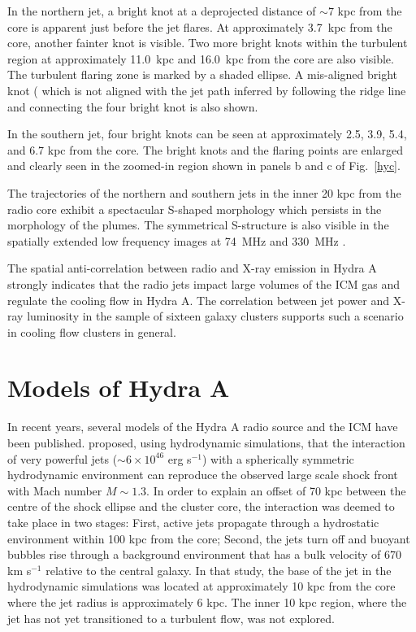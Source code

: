 In the northern jet, a bright knot at a deprojected distance of $\sim 7$ kpc from the core is apparent just before the jet flares. At approximately 3.7~kpc from the core, another fainter knot is visible. Two more bright knots within the turbulent region at approximately 11.0~kpc and 16.0~kpc from the core are also visible. The turbulent flaring zone is marked by a shaded ellipse. A mis-aligned bright knot  ( which is not aligned with the jet path inferred by following the ridge line and connecting the four bright knot is also shown.

 In the southern jet, four bright knots can be seen at approximately 2.5, 3.9, 5.4, and 6.7 kpc from the core. The bright knots and the flaring points are enlarged and clearly seen in the zoomed-in region shown in panels b and c of Fig.~\ref{hyc}. 

The trajectories of the northern and southern jets in the inner 20 kpc from the radio core exhibit a spectacular S-shaped morphology which persists in the morphology of the plumes. The symmetrical S-structure is also visible in the spatially extended low frequency images at 74~MHz and 330~MHz \citep{lane04}. 

The spatial anti-correlation between radio and X-ray emission in Hydra A strongly indicates that the radio jets impact large volumes of the ICM gas and regulate the cooling flow in Hydra A. The correlation between jet power and X-ray luminosity in the \citet{birzan04} sample of sixteen galaxy clusters supports such a scenario in cooling flow clusters in general. 

\section{Models of Hydra A}\label{int:mod}
In recent years, several models of the Hydra A radio source and the ICM have been published. \citet{simionescu09} proposed, using hydrodynamic simulations, that the interaction of very powerful jets ($\sim6\times10^{46}$ erg s$^{-1}$) with a spherically symmetric hydrodynamic environment can reproduce the observed large scale shock front with Mach number $M \sim 1.3$. In order to explain an offset of 70 kpc between the centre of the shock ellipse and the cluster core, the interaction was deemed to take place in two stages: First, active jets propagate through a hydrostatic environment within 100 kpc from the core; Second, the jets turn off and buoyant bubbles rise through a background environment that has a bulk velocity of 670 km s$^{-1}$ relative to the central galaxy. In that study, the base of the jet in the hydrodynamic simulations was located at approximately 10 kpc from the core where the jet radius is approximately 6 kpc. The inner 10 kpc region, where the jet has not yet transitioned to a turbulent flow, was not explored. 

